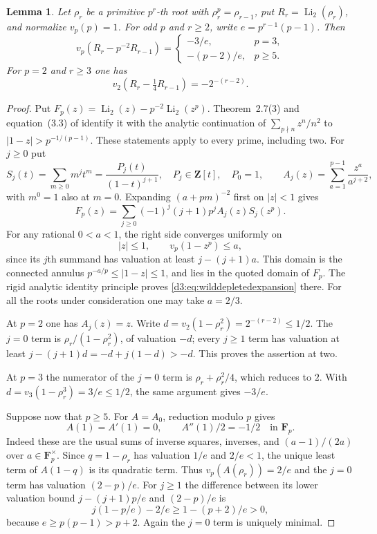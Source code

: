 \documentclass[11pt,a4paper]{amsart}
\numberwithin{equation}{section}
\newtheorem{lemma}[theorem]{Lemma}
\theoremstyle{definition}
\theoremstyle{remark}
\newcommand{\Z}{\mathbf Z}
\newcommand{\F}{\mathbf F}
\begin{document}
\begin{lemma}\label{d3:lem:wilddepletion}
Let $\rho_r$ be a primitive $p^r$-th root with
$\rho_r^p=\rho_{r-1}$, put $R_r=\operatorname{Li}_2(\rho_r)$,
and normalize $v_p(p)=1$.
For odd $p$ and $r\geq2$, write $e=p^{r-1}(p-1)$. Then
\[
 v_p(R_r-p^{-2}R_{r-1})=
 \begin{cases}
 -3/e,&p=3,\\
 -(p-2)/e,&p\geq5.
 \end{cases}
\]
For $p=2$ and $r\geq3$ one has
\[
 v_2(R_r-\tfrac14R_{r-1})=-2^{-(r-2)}.
\]
\end{lemma}
\begin{proof}
Put $F_p(z)=\operatorname{Li}_2(z)-p^{-2}\operatorname{Li}_2(z^p)$.
Theorem~2.7(3) and equation~(3.3) of
\cite{BesserDeJeuAlgorithm} identify it with the analytic continuation
of $\sum_{p\nmid n}z^n/n^2$ to $|1-z|>p^{-1/(p-1)}$.
These statements apply to every prime, including two.
For $j\geq0$ put
\[
 S_j(t)=\sum_{m\geq0}m^jt^m=\frac{P_j(t)}{(1-t)^{j+1}},
 \quad P_j\in\Z[t],\quad P_0=1,
 \qquad
 A_j(z)=\sum_{a=1}^{p-1}\frac{z^a}{a^{j+2}},
\]
with $m^0=1$ also at $m=0$.
Expanding $(a+pm)^{-2}$ first on $|z|<1$ gives
\begin{equation}\label{d3:eq:wilddepletedexpansion}
 F_p(z)=\sum_{j\geq0}(-1)^j(j+1)p^j A_j(z)S_j(z^p).
\end{equation}
For any rational $0<a<1$, the right side converges uniformly on
\[
 |z|\leq1,\qquad v_p(1-z^p)\leq a,
\]
since its $j$th summand has valuation at least $j-(j+1)a$.
This domain is the connected annulus
$p^{-a/p}\leq|1-z|\leq1$, and lies in the quoted domain of $F_p$.
The rigid analytic identity principle proves
\eqref{d3:eq:wilddepletedexpansion} there. For all the roots under
consideration one may take $a=2/3$.

At $p=2$ one has $A_j(z)=z$. Write
$d=v_2(1-\rho_r^2)=2^{-(r-2)}\leq1/2$.
The $j=0$ term is $\rho_r/(1-\rho_r^2)$, of valuation $-d$;
every $j\geq1$ term has valuation at least
$j-(j+1)d=-d+j(1-d)>-d$. This proves the assertion at two.

At $p=3$ the numerator of the $j=0$ term is
$\rho_r+\rho_r^2/4$, which reduces to $2$.
With $d=v_3(1-\rho_r^3)=3/e\leq1/2$, the same argument gives $-3/e$.

Suppose now that $p\geq5$. For $A=A_0$, reduction modulo $p$ gives
\[
 A(1)=A'(1)=0,\qquad A''(1)/2=-1/2\quad\text{in }\F_p.
\]
Indeed these are the usual sums of inverse squares, inverses,
and $(a-1)/(2a)$ over $a\in\F_p^\times$.
Since $q=1-\rho_r$ has valuation $1/e$ and $2/e<1$,
the unique least term of $A(1-q)$ is its quadratic term.
Thus $v_p(A(\rho_r))=2/e$ and the $j=0$ term has valuation $(2-p)/e$.
For $j\geq1$ the difference between its lower valuation bound
$j-(j+1)p/e$ and $(2-p)/e$ is
\[
 j(1-p/e)-2/e\geq1-(p+2)/e>0,
\]
because $e\geq p(p-1)>p+2$.
Again the $j=0$ term is uniquely minimal.
\end{proof}
\end{document}
